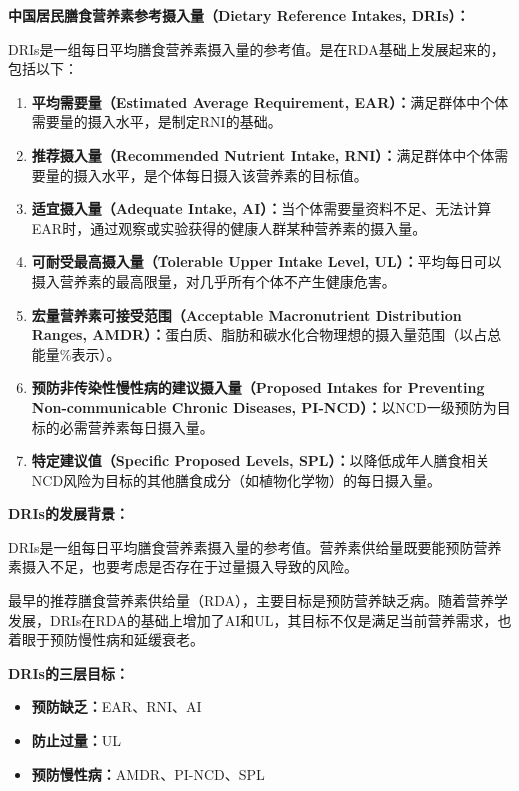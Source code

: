 \begin{keybox}
\textbf{中国居民膳食营养素参考摄入量（Dietary Reference Intakes, DRIs）：}

DRIs是一组每日平均膳食营养素摄入量的参考值。是在RDA基础上发展起来的，包括以下：

\begin{enumerate}[leftmargin=*]
    \item \textbf{平均需要量（Estimated Average Requirement, EAR）：}满足群体中个体需要量的摄入水平，是制定RNI的基础。
    \item \textbf{推荐摄入量（Recommended Nutrient Intake, RNI）：}满足群体中个体需要量的摄入水平，是个体每日摄入该营养素的目标值。
    \item \textbf{适宜摄入量（Adequate Intake, AI）：}当个体需要量资料不足、无法计算EAR时，通过观察或实验获得的健康人群某种营养素的摄入量。
    \item \textbf{可耐受最高摄入量（Tolerable Upper Intake Level, UL）：}平均每日可以摄入营养素的最高限量，对几乎所有个体不产生健康危害。
    \item \textbf{宏量营养素可接受范围（Acceptable Macronutrient Distribution Ranges, AMDR）：}蛋白质、脂肪和碳水化合物理想的摄入量范围（以占总能量\%表示）。
    \item \textbf{预防非传染性慢性病的建议摄入量（Proposed Intakes for Preventing Non-communicable Chronic Diseases, PI-NCD）：}以NCD一级预防为目标的必需营养素每日摄入量。
    \item \textbf{特定建议值（Specific Proposed Levels, SPL）：}以降低成年人膳食相关NCD风险为目标的其他膳食成分（如植物化学物）的每日摄入量。
\end{enumerate}
\end{keybox}

\begin{tipbox}
\textbf{DRIs的发展背景：}

DRIs是一组每日平均膳食营养素摄入量的参考值。营养素供给量既要能预防营养素摄入不足，也要考虑是否存在于过量摄入导致的风险。

最早的推荐膳食营养素供给量（RDA），主要目标是预防营养缺乏病。随着营养学发展，DRIs在RDA的基础上增加了AI和UL，其目标不仅是满足当前营养需求，也着眼于预防慢性病和延缓衰老。

\textbf{DRIs的三层目标：}
\begin{itemize}[leftmargin=*]
    \item \textbf{预防缺乏：}EAR、RNI、AI
    \item \textbf{防止过量：}UL
    \item \textbf{预防慢性病：}AMDR、PI-NCD、SPL
\end{itemize}
\end{tipbox}

